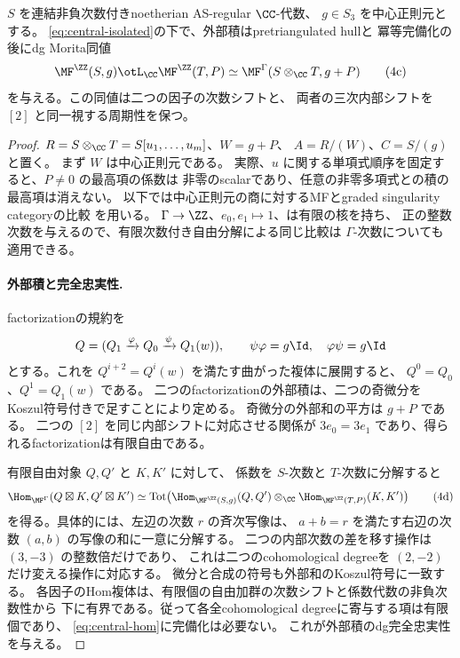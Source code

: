 \begin{lemma}[任意の孤立中心三次式に対する外部積]\label{lem:TS}
 \(S\) を連結非負次数付きnoetherian AS-regular \(\CC\)-代数、
 \(g\in S_3\) を中心正則元とする。
 \eqref{eq:central-isolated}の下で、外部積はpretriangulated hullと
 冪等完備化の後にdg Morita同値
 \[
 \MF^\ZZ(S,g)\otL_\CC\MF^\ZZ(T,P)
 \simeq
 \MF^\Gamma(S\otimes_\CC T,g+P)                             \tag{4c}\label{eq:central-TS}
 \]
 を与える。この同値は二つの因子の次数シフトと、
 両者の三次内部シフトを \([2]\) と同一視する周期性を保つ。
\end{lemma}
\begin{proof}
 \(R=S\otimes_\CC T=S[u_1,\ldots,u_m]\)、\(W=g+P\)、
 \(A=R/(W)\)、\(C=S/(g)\) と置く。
 まず \(W\) は中心正則元である。
 実際、\(u\) に関する単項式順序を固定すると、\(P\ne0\) の最高項の係数は
 非零のscalarであり、任意の非零多項式との積の最高項は消えない。
 以下では中心正則元の商に対するMFとgraded singularity categoryの比較
 \cite[Theorem 5.8]{CCKM}を用いる。
 \(\Gamma\to\ZZ\)、\(e_0,e_1\mapsto1\)、は有限の核を持ち、
 正の整数次数を与えるので、有限次数付き自由分解による同じ比較は
 \(\Gamma\)-次数についても適用できる。

 \paragraph{外部積と完全忠実性.}
 factorizationの規約を
 \[
 Q=(Q_1\xrightarrow{\varphi}Q_0
                  \xrightarrow{\psi}Q_1(w)),\qquad
 \psi\varphi=g\Id,\quad\varphi\psi=g\Id
 \]
 とする。これを \(Q^{i+2}=Q^i(w)\) を満たす曲がった複体に展開すると、
 \(Q^0=Q_0\)、\(Q^1=Q_1(w)\) である。
 二つのfactorizationの外部積は、二つの奇微分をKoszul符号付きで足すことにより定める。
 奇微分の外部和の平方は \(g+P\) である。
 二つの \([2]\) を同じ内部シフトに対応させる関係が
 \(3e_0=3e_1\) であり、得られるfactorizationは有限自由である。

 有限自由対象 \(Q,Q'\) と \(K,K'\) に対して、
 係数を \(S\)-次数と \(T\)-次数に分解すると
 \[
 \Hom_{\MF^\Gamma}(Q\boxtimes K,Q'\boxtimes K')
 \simeq
 \operatorname{Tot}\!\left(
   \Hom_{\MF^\ZZ(S,g)}(Q,Q')\otimes_\CC
   \Hom_{\MF^\ZZ(T,P)}(K,K')\right)                         \tag{4d}\label{eq:central-hom}
 \]
 を得る。具体的には、左辺の次数 \(r\) の斉次写像は、
 \(a+b=r\) を満たす右辺の次数 \((a,b)\) の写像の和に一意に分解する。
 二つの内部次数の差を移す操作は \((3,-3)\) の整数倍だけであり、
 これは二つのcohomological degreeを \((2,-2)\) だけ変える操作に対応する。
 微分と合成の符号も外部和のKoszul符号に一致する。
 各因子のHom複体は、有限個の自由加群の次数シフトと係数代数の非負次数性から
 下に有界である。従って各全cohomological degreeに寄与する項は有限個であり、
 \eqref{eq:central-hom}に完備化は必要ない。
 これが外部積のdg完全忠実性を与える。


\end{proof}

